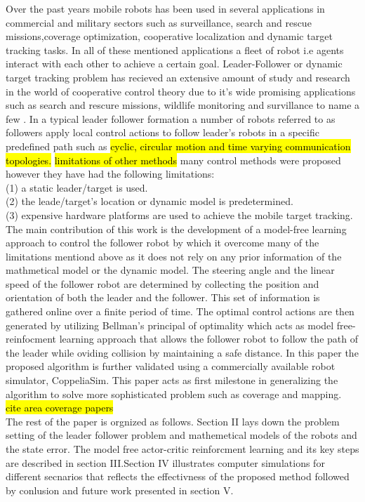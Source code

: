 \documentclass[conference]{IEEEtran}
\begin{document}
Over the past years mobile robots has been used in several applications in commercial and military sectors such as surveillance, search and rescue missions,coverage optimization, cooperative localization and dynamic target tracking tasks. In all of these mentioned applications a fleet of robot i.e agents interact with each other to achieve a certain goal. Leader-Follower or dynamic target tracking problem has recieved an extensive amount of study and research in the world of cooperative control theory due to it's wide promising applications such as search and rescure missions, wildlife monitoring and survillance to name a few . In a typical leader follower formation a number of robots referred to as followers apply local control actions to follow leader's robots in a specific predefined path such as \hl {cyclic, circular motion and time varying communication topologies.} \hl {limitations of other methods} many control methods were proposed however they have had the following limitations:
\\(1) a static leader/target is used.
\\(2) the leade/target's location or dynamic model is predetermined.  
\\(3) expensive hardware platforms are used to achieve the mobile target tracking. 
 \\The main contribution of this work is the development of a model-free learning approach to control the follower robot by which it overcome many of the limitations mentiond above as it does not rely on any prior information of the mathmetical model or the dynamic model. The steering angle and the linear speed of the follower robot are determined by collecting the position and orientation of both the leader and the follower. This set of information is gathered online over a finite period of time. The optimal control actions are then generated by utilizing Bellman's principal of optimality which acts as model free-reinfocment learning approach that allows the follower robot to follow the path of the leader while oviding collision by maintaining a safe distance. In this paper the proposed algorithm is further validated using a commercially available robot simulator, CoppeliaSim. This paper acts as first milestone in generalizing the algorithm to solve more sophisticated problem such as coverage and mapping. \hl{cite area coverage papers}
 \\The rest of the paper is orgnized as follows. Section II lays down the problem setting of the leader follower problem and mathemetical models of the robots and the state error. The model free actor-critic reinforcment learning and its key steps are described in section III.Section IV illustrates computer simulations for different secnarios that reflects the effectivness of the proposed method followed by conlusion and future work presented in section V.      
\end{document}
